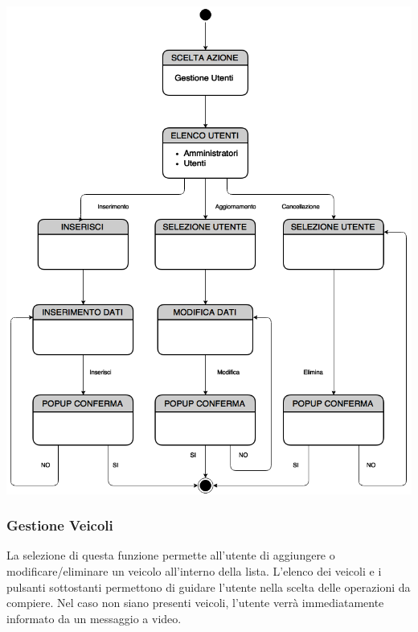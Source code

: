 \documentclass[a4paper,12pt]{beamer}
\begin{document}
\begin{frame}
\begin{center}
\includegraphics[scale=0.45]{../UseCase/Utenti.png}
\end{center}
\end{frame}

\begin{frame}
\frametitle{Gestione Veicoli}
La selezione di questa funzione permette all'utente di aggiungere o modificare/eliminare un veicolo all'interno della lista. L'elenco dei veicoli e i pulsanti sottostanti permettono di guidare l'utente nella scelta delle operazioni da compiere. Nel caso non siano presenti veicoli, l'utente verrà immediatamente informato da un messaggio a video.
\end{frame}
\end{document}
